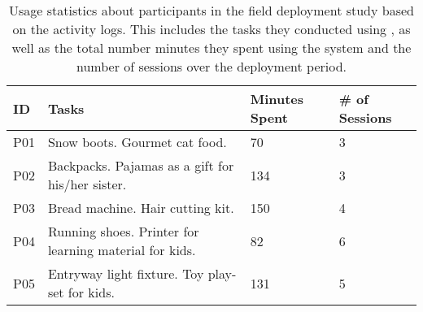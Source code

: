 \begin{table*}
  \centering
  \small
  \begin{tabular}{ l l l l}
  
	\hline
	
	\textbf{ID} & \textbf{Tasks} & \textbf{Minutes Spent} & \textbf{\# of Sessions} \\
	
	\hline
	
	P01 & Snow boots. Gourmet cat food. & 70 & 3 \\
	P02 & Backpacks. Pajamas as a gift for his/her sister. & 134 & 3 \\
	P03 & Bread machine. Hair cutting kit. & 150 & 4 \\
	P04 & Running shoes. Printer for learning material for kids. & 82 & 6 \\
	P05 & Entryway light fixture. Toy play-set for kids. & 131 & 5 \\
	
	\hline
	
  \end{tabular}
  \caption[List of participants and usage pattern for the deployment study.]{Usage statistics about participants in the field deployment study based on the activity logs. This includes the tasks they conducted using \SYSTEM, as well as the total number minutes they spent using the system and the number of sessions over the deployment period.}
  \label{tab:participants}
\end{table*}
